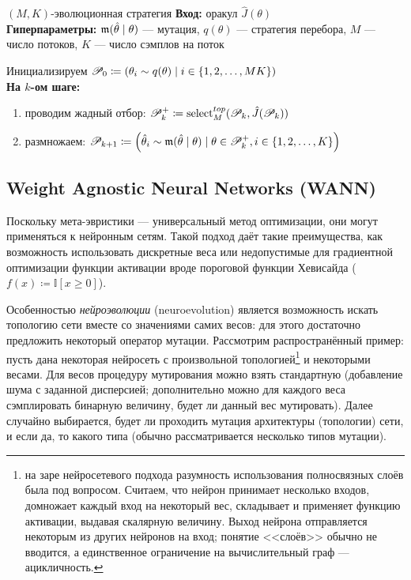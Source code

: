 \begin{algorithm}{$(M, K)$-эволюционная стратегия}
\textbf{Вход:} оракул $\hat{J}(\theta)$ \\
\textbf{Гиперпараметры:} $\mathfrak{m}(\hat{\theta} \mid \theta)$ --- мутация, $q(\theta)$ --- стратегия перебора, $M$ --- число потоков, $K$ --- число сэмплов на поток

\vspace{0.3cm}
Инициализируем $\mathscr{P}_0 \coloneqq \left( \theta_i \sim q(\theta) \mid i \in \{1, 2, \dots , MK \} \right)$ \\
\textbf{На $k$-ом шаге:}
\begin{enumerate}
    \item проводим жадный отбор: $\mathscr{P}^{+}_k \coloneqq \mathrm{select}^{\mathop{top}}_M(\mathscr{P}_k, \hat{J}(\mathscr{P}_k))$
    \item размножаем: $\mathscr{P}_{k+1} \coloneqq \left( \hat{\theta}_i \sim \mathfrak{m}(\hat{\theta} \mid \theta) \mid \theta \in \mathscr{P}^{+}_k, i \in \{1, 2, \dots , K\} \right)$
\end{enumerate}
\end{algorithm}

\begin{example}
\begin{center}
\end{center}
\end{example}

\subsection{Weight Agnostic Neural Networks (WANN)}

Поскольку мета-эвристики --- универсальный метод оптимизации, они могут применяться к нейронным сетям. Такой подход даёт такие преимущества, как возможность использовать дискретные веса или недопустимые для градиентной оптимизации функции активации вроде пороговой функции Хевисайда ($f(x) \coloneqq \mathbb{I}[x \ge 0]$). 

Особенностью \emph{нейроэволюции} (neuroevolution) является возможность искать топологию сети вместе со значениями самих весов: для этого достаточно предложить некоторый оператор мутации. Рассмотрим распространённый пример: пусть дана некоторая нейросеть с произвольной топологией\footnote{на заре нейросетевого подхода разумность использования полносвязных слоёв была под вопросом. Считаем, что нейрон принимает несколько входов, домножает каждый вход на некоторый вес, складывает и применяет функцию активации, выдавая скалярную величину. Выход нейрона отправляется некоторым из других нейронов на вход; понятие <<слоёв>> обычно не вводится, а единственное ограничение на вычислительный граф --- ацикличность.} и некоторыми весами. Для весов процедуру мутирования можно взять стандартную (добавление шума с заданной дисперсией; дополнительно можно для каждого веса сэмплировать бинарную величину, будет ли данный вес мутировать). Далее случайно выбирается, будет ли проходить мутация архитектуры (топологии) сети, и если да, то какого типа (обычно рассматривается несколько типов мутации).


